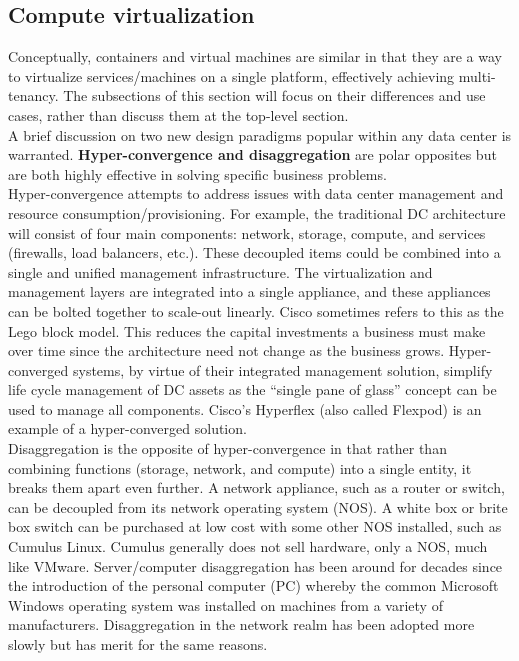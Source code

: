 \subsection{Compute virtualization}
Conceptually, containers and virtual machines are similar in that they are a
way to virtualize services/machines on a single platform, effectively
achieving multi-tenancy. The subsections of this section will focus on their
differences and use cases, rather than discuss them at the top-level
section. \\

A brief discussion on two new design paradigms popular within any data center
is warranted. \textbf{Hyper-convergence and disaggregation} are polar
opposites but are both highly effective in solving specific business problems. \\

Hyper-convergence attempts to address issues with data center management and
resource consumption/provisioning. For example, the traditional DC
architecture will consist of four main components: network, storage, compute,
and services (firewalls, load balancers, etc.). These decoupled items could be
combined into a single and unified management infrastructure. The
virtualization and management layers are integrated into a single appliance,
and these appliances can be bolted together to scale-out linearly. Cisco
sometimes refers to this as the Lego block model. This reduces the capital
investments a business must make over time since the architecture need not
change as the business grows. Hyper-converged systems, by virtue of their
integrated management solution, simplify life cycle management of DC assets as
the ``single pane of glass'' concept can be used to manage all components.
Cisco's Hyperflex (also called Flexpod) is an example of a hyper-converged
solution. \\

Disaggregation is the opposite of hyper-convergence in that rather than
combining functions (storage, network, and compute) into a single entity, it
breaks them apart even further. A network appliance, such as a router or
switch, can be decoupled from its network operating system (NOS). A white box
or brite box switch can be purchased at low cost with some other NOS
installed, such as Cumulus Linux. Cumulus generally does not sell hardware,
only a NOS, much like VMware. Server/computer disaggregation has been around
for decades since the introduction of the personal computer (PC) whereby the
common Microsoft Windows operating system was installed on machines from a
variety of manufacturers. Disaggregation in the network realm has been adopted
more slowly but has merit for the same reasons.
